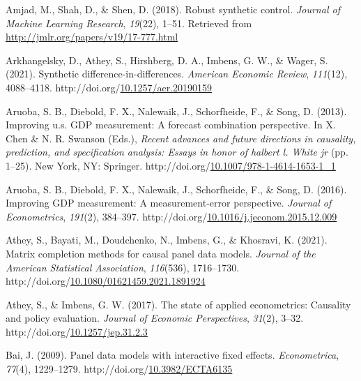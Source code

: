 \documentclass[12pt,nobind, a4paper]{reedthesis}
\newlength{\cslhangindent}
\newenvironment{CSLReferences}[2] %
{%
	\setlength{\parindent}{0pt}
	\ifodd #1 \everypar{\setlength{\hangindent}{\cslhangindent}}\ignorespaces\fi
	\ifnum #2 > 0
	\setlength{\parskip}{#2\baselineskip}
	\fi
}%
{}
\begin{document}
\begin{CSLReferences}{1}{0}
 \leavevmode{}%
 Amjad, M., Shah, D., \& Shen, D. (2018). Robust synthetic control. \emph{Journal of Machine Learning Research}, \emph{19}(22), 1--51. Retrieved from \url{http://jmlr.org/papers/v19/17-777.html}

 \leavevmode{}%
 Arkhangelsky, D., Athey, S., Hirshberg, D. A., Imbens, G. W., \& Wager, S. (2021). Synthetic difference-in-differences. \emph{American Economic Review}, \emph{111}(12), 4088--4118. http://doi.org/\href{https://doi.org/10.1257/aer.20190159}{10.1257/aer.20190159}

 \leavevmode{}%
 Aruoba, S. B., Diebold, F. X., Nalewaik, J., Schorfheide, F., \& Song, D. (2013). Improving u.s. {GDP} measurement: A forecast combination perspective. In X. Chen \& N. R. Swanson (Eds.), \emph{Recent advances and future directions in causality, prediction, and specification analysis: Essays in honor of halbert l. White jr} (pp. 1--25). New York, {NY}: Springer. http://doi.org/\href{https://doi.org/10.1007/978-1-4614-1653-1_1}{10.1007/978-1-4614-1653-1\_1}

 \leavevmode{}%
 Aruoba, S. B., Diebold, F. X., Nalewaik, J., Schorfheide, F., \& Song, D. (2016). Improving {GDP} measurement: A measurement-error perspective. \emph{Journal of Econometrics}, \emph{191}(2), 384--397. http://doi.org/\href{https://doi.org/10.1016/j.jeconom.2015.12.009}{10.1016/j.jeconom.2015.12.009}

 \leavevmode{}%
 Athey, S., Bayati, M., Doudchenko, N., Imbens, G., \& Khosravi, K. (2021). Matrix completion methods for causal panel data models. \emph{Journal of the American Statistical Association}, \emph{116}(536), 1716--1730. http://doi.org/\href{https://doi.org/10.1080/01621459.2021.1891924}{10.1080/01621459.2021.1891924}

 \leavevmode{}%
 Athey, S., \& Imbens, G. W. (2017). The state of applied econometrics: Causality and policy evaluation. \emph{Journal of Economic Perspectives}, \emph{31}(2), 3--32. http://doi.org/\href{https://doi.org/10.1257/jep.31.2.3}{10.1257/jep.31.2.3}

 \leavevmode{}%
 Bai, J. (2009). Panel data models with interactive fixed effects. \emph{Econometrica}, \emph{77}(4), 1229--1279. http://doi.org/\href{https://doi.org/10.3982/ECTA6135}{10.3982/ECTA6135}


\end{CSLReferences}
\end{document}
